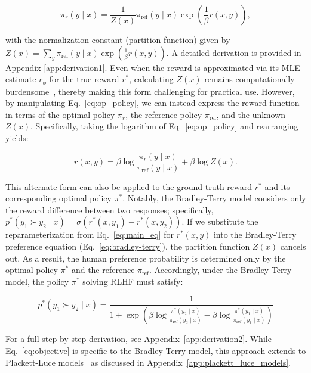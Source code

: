 \begin{equation}\label{eq:op_policy}
    \pi_r(y\mid x) = \frac{1}{Z(x)}\pi_\text{ref}(y\mid x)\exp\left(\frac{1}{\beta}r(x, y)\right),
\end{equation}

with the normalization constant (partition function) given by $Z(x) =\sum_{y}\pi_\text{ref}(y\mid x)\exp\left(\frac{1}{\beta}r(x, y)\right)$. A detailed derivation is provided in Appendix \ref{app:derivation1}. Even when the reward is approximated via its MLE estimate $r_{\phi}$ for the true reward $r^*$, calculating $Z(x)$ remains computationally burdensome~\citep{korbak2022reinforcement, go2023aligning}, thereby making this form challenging for practical use. However, by manipulating Eq.~\ref{eq:op_policy}, we can instead express the reward function in terms of the optimal policy $\pi_r$, the reference policy $\pi_\text{ref}$, and the unknown $Z(x)$. Specifically, taking the logarithm of Eq.~\ref{eq:op_policy} and rearranging yields:

\begin{equation}\label{eq:main_eq}
    r(x,y) =\beta \log \frac{\pi_r(y\mid x)}{\pi_\text{ref}(y\mid x)} + \beta \log Z(x).
\end{equation}

This alternate form can also be applied to the ground-truth reward $r^*$ and its corresponding optimal policy $\pi^*$. Notably, the Bradley-Terry model considers only the reward difference between two responses; specifically, ${p^*(y_1 \succ y_2 \mid x) = \sigma(r^*(x, y_1) - r^*(x, y_2))}$. If we substitute the reparameterization from Eq.~\ref{eq:main_eq} for $r^*(x,y)$ into the Bradley-Terry preference equation (Eq.~\ref{eq:bradley-terry}), the partition function $Z(x)$ cancels out. As a result, the human preference probability is determined only by the optimal policy $\pi^*$ and the reference $\pi_\text{ref}$. Accordingly, under the Bradley-Terry model, the policy $\pi^*$ solving RLHF must satisfy:

\begin{equation}\label{eq:objective}
    p^*(y_1\succ y_2 \mid x)=\frac{1}{1 + \exp\left(\beta \log \frac{\pi^*(y_2\mid x)}{\pi_\text{ref}(y_2\mid x)} - \beta \log \frac{\pi^*(y_1\mid x)}{\pi_\text{ref}(y_1\mid x)}\right)}
\end{equation}

For a full step-by-step derivation, see Appendix~\ref{app:derivation2}. While Eq.~\ref{eq:objective} is specific to the Bradley-Terry model, this approach extends to Plackett-Luce models~\citep{plackett1975analysis, luce2012individual} as discussed in Appendix~\ref{app:plackett_luce_models}.

